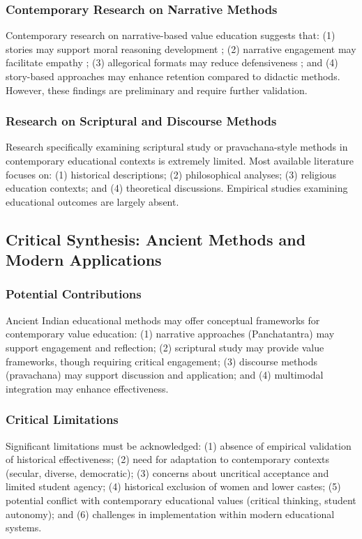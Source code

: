 \documentclass[12pt,a4paper,twocolumn]{article}
\begin{document}
\subsubsection{Contemporary Research on Narrative Methods}

Contemporary research on narrative-based value education suggests that: (1) stories may support moral reasoning development \citep{Joshi2021}; (2) narrative engagement may facilitate empathy \citep{Mar2011}; (3) allegorical formats may reduce defensiveness \citep{Mishra2017}; and (4) story-based approaches may enhance retention compared to didactic methods. However, these findings are preliminary and require further validation.

\subsubsection{Research on Scriptural and Discourse Methods}

Research specifically examining scriptural study or pravachana-style methods in contemporary educational contexts is extremely limited. Most available literature focuses on: (1) historical descriptions; (2) philosophical analyses; (3) religious education contexts; and (4) theoretical discussions. Empirical studies examining educational outcomes are largely absent.

\subsection{Critical Synthesis: Ancient Methods and Modern Applications}

\subsubsection{Potential Contributions}

Ancient Indian educational methods may offer conceptual frameworks for contemporary value education: (1) narrative approaches (Panchatantra) may support engagement and reflection; (2) scriptural study may provide value frameworks, though requiring critical engagement; (3) discourse methods (pravachana) may support discussion and application; and (4) multimodal integration may enhance effectiveness.

\subsubsection{Critical Limitations}

Significant limitations must be acknowledged: (1) absence of empirical validation of historical effectiveness; (2) need for adaptation to contemporary contexts (secular, diverse, democratic); (3) concerns about uncritical acceptance and limited student agency; (4) historical exclusion of women and lower castes; (5) potential conflict with contemporary educational values (critical thinking, student autonomy); and (6) challenges in implementation within modern educational systems.
\end{document}

